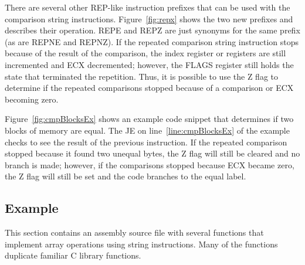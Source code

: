 There are several other {\code REP}-like instruction prefixes that can be
used with the comparison string instructions. Figure~\ref{fig:repx} shows
the two new prefixes and describes their operation. {\code REPE}  and
{\code REPZ} are just synonyms for the same prefix (as are {\code REPNE} 
and {\code REPNZ}). If the repeated comparison string instruction stops
because of the result of the comparison, the index register or registers
are still incremented and ECX decremented; however, the FLAGS register
still holds the state that terminated the repetition. 
 Thus, it is possible
to use the Z flag to determine if the repeated comparisons stopped because
of a comparison or ECX becoming zero.

Figure~\ref{fig:cmpBlocksEx} shows an example code snippet that determines
if two blocks of memory are equal. The {\code JE} on 
line~\ref{line:cmpBlocksEx} of the example checks to see the result of the
previous instruction. If the repeated comparison stopped because it found
two unequal bytes, the Z flag will still be cleared and no branch is made;
however, if the comparisons stopped because ECX became zero, the Z flag
will still be set and the code branches to the {\code equal} label.

\subsection{Example}

This section contains an assembly source file with several functions that
implement array operations using string instructions. Many of the functions
duplicate familiar C library functions.

